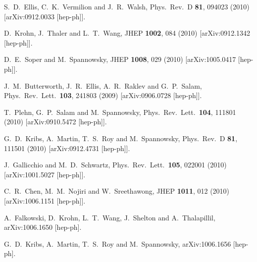 \documentclass{JHEP3}
\begin{document}
\begin{thebibliography}{99}
 S.~D.~Ellis, C.~K.~Vermilion and J.~R.~Walsh,
 Phys.\ Rev.\  D {\bf 81}, 094023 (2010)
 [arXiv:0912.0033 [hep-ph]].

 D.~Krohn, J.~Thaler and L.~T.~Wang,
 JHEP {\bf 1002}, 084 (2010)
 [arXiv:0912.1342 [hep-ph]].

 D.~E.~Soper and M.~Spannowsky,
 JHEP {\bf 1008}, 029 (2010)
 [arXiv:1005.0417 [hep-ph]].



 J.~M.~Butterworth, J.~R.~Ellis, A.~R.~Raklev and G.~P.~Salam,
 Phys.\ Rev.\ Lett.\  {\bf 103}, 241803 (2009)
 [arXiv:0906.0728 [hep-ph]].

 T.~Plehn, G.~P.~Salam and M.~Spannowsky,
 Phys.\ Rev.\ Lett.\  {\bf 104}, 111801 (2010)
 [arXiv:0910.5472 [hep-ph]].

 G.~D.~Kribs, A.~Martin, T.~S.~Roy and M.~Spannowsky,
 Phys.\ Rev.\  D {\bf 81}, 111501 (2010)
 [arXiv:0912.4731 [hep-ph]].

 J.~Gallicchio and M.~D.~Schwartz,
 Phys.\ Rev.\ Lett.\  {\bf 105}, 022001 (2010)
 [arXiv:1001.5027 [hep-ph]].

 C.~R.~Chen, M.~M.~Nojiri and W.~Sreethawong,
 JHEP {\bf 1011}, 012 (2010)
 [arXiv:1006.1151 [hep-ph]].

 A.~Falkowski, D.~Krohn, L.~T.~Wang, J.~Shelton and A.~Thalapillil,
 arXiv:1006.1650 [hep-ph].

 G.~D.~Kribs, A.~Martin, T.~S.~Roy and M.~Spannowsky,
 arXiv:1006.1656 [hep-ph].


\end{thebibliography}
\end{document}
